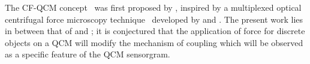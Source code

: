 The CF-QCM concept~\cite{webster2013qcm} was first proposed by
, inspired by a multiplexed optical centrifugal force microscopy
technique~\cite{halvorsen2010massively} developed by  and
.  The present work lies in between that of 
and ; it is conjectured that the application of force for
discrete objects on a QCM will modify the mechanism of coupling which will
be observed as a specific feature of the QCM sensorgram.
